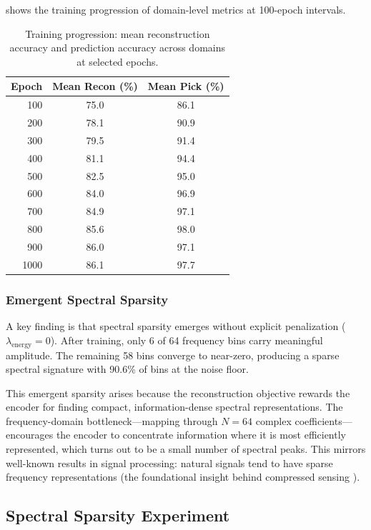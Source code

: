 \documentclass[10pt,twocolumn]{article}
\begin{document}
 shows the training progression of domain-level metrics at 100-epoch intervals.

\begin{table}[t]
\centering
\caption{Training progression: mean reconstruction accuracy and prediction accuracy across domains at selected epochs.}
\label{tab:v93_progression}
\small
\begin{tabular}{@{}rcc@{}}
\toprule
\textbf{Epoch} & \textbf{Mean Recon (\%)} & \textbf{Mean Pick (\%)} \\
\midrule
100  & 75.0 & 86.1 \\
200  & 78.1 & 90.9 \\
300  & 79.5 & 91.4 \\
400  & 81.1 & 94.4 \\
500  & 82.5 & 95.0 \\
600  & 84.0 & 96.9 \\
700  & 84.9 & 97.1 \\
800  & 85.6 & 98.0 \\
900  & 86.0 & 97.1 \\
1000 & 86.1 & 97.7 \\
\bottomrule
\end{tabular}
\end{table}

\subsubsection{Emergent Spectral Sparsity}

A key finding is that spectral sparsity emerges without explicit penalization ($\lambda_\text{energy} = 0$). After training, only 6 of 64 frequency bins carry meaningful amplitude. The remaining 58 bins converge to near-zero, producing a sparse spectral signature with 90.6\% of bins at the noise floor.

This emergent sparsity arises because the reconstruction objective rewards the encoder for finding compact, information-dense spectral representations. The frequency-domain bottleneck---mapping through $N = 64$ complex coefficients---encourages the encoder to concentrate information where it is most efficiently represented, which turns out to be a small number of spectral peaks. This mirrors well-known results in signal processing: natural signals tend to have sparse frequency representations (the foundational insight behind compressed sensing \cite{candes2006robust}).

\subsection{Spectral Sparsity Experiment}
\end{document}
